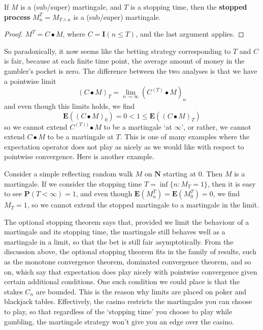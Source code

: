 \begin{theorem}
    If $M$ is a (sub/super) martingale, and $T$ is a stopping time, then the {\bf stopped process} $M^T_n = M_{T \wedge n}$ is a (sub/super) martingale.
\end{theorem}
\begin{proof}
    $M^T = C \bullet M$, where $C = \mathbf{I}(n \leq T)$, and the last argument applies.
\end{proof}

So paradoxically, it now seems like the betting strategy corresponding to $T$ and $C$ is fair, because at each finite time point, the average amount of money in the gambler's pocket is zero. The difference between the two analyses is that we have a pointwise limit
%
\[ (C \bullet M)_T = \lim_{n \to \infty} (C^{(T)} \bullet M)_n \]
%
and even though this limits holds, we find
%
\[ \mathbf{E}((C \bullet M)_0) = 0 < 1 \leq \mathbf{E}((C \bullet M)_T) \]
%
so we cannot extend $C^{(T))} \bullet M$ to be a martingale `at $\infty$', or rather, we cannot extend $C \bullet M$ to be a martingale at $T$. This is one of many examples where the expectation operator does not play as nicely as we would like with respect to pointwise convergence. Here is another example.

\begin{example}
    Consider a simple reflecting random walk $M$ on $\mathbf{N}$ starting at 0. Then $M$ is a martingale. If we consider the stopping time $T = \inf \{ n: M_T = 1 \}$, then it is easy to see $\mathbf{P}(T < \infty) = 1$, and even though $\mathbf{E}(M^T_n) = \mathbf{E}(M^T_0) = 0$, we find $M_T = 1$, so we cannot extend the stopped martingale to a martingale in the limit.
\end{example}

The optional stopping theorem says that, provided we limit the behaviour of a martingale and its stopping time, the martingale still behaves well as a martingale in a limit, so that the bet is still fair asymptotically. From the discussion above, the optional stopping theorem fits in the family of results, such as the monotone convergence theorem, dominated convergence theorem, and so on, which say that expectation does play nicely with pointwise convergence given certain additional conditions. One such condition we could place is that the stakes $C_n$ are bounded. This is the reason why limits are placed on poker and blackjack tables. Effectively, the casino restricts the martingales you can choose to play, so that regardless of the `stopping time' you choose to play while gambling, the martingale strategy won't give you an edge over the casino.

